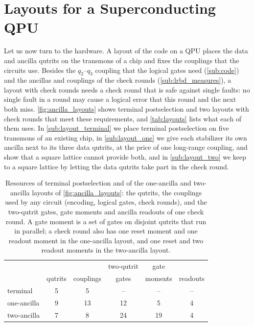 \section{Layouts for a Superconducting QPU}
\label{sub:ancilla_layouts}

Let us now turn to the hardware. A layout of the code on a QPU places the data and ancilla qutrits on the transmons of a chip and fixes the couplings that the circuits use. Besides the $q_2$--$q_3$ coupling that the logical gates need (\autoref{sub:code}) and the ancillas and couplings of the check rounds (\autoref{sub:lrbd_measures}), a layout with check rounds needs a check round that is safe against single faults: no single fault in a round may cause a logical error that this round and the next both miss. \autoref{fig:ancilla_layouts} shows terminal postselection and two layouts with check rounds that meet these requirements, and \autoref{tab:layouts} lists what each of them uses. In \autoref{sub:layout_terminal} we place terminal postselection on five transmons of an existing chip, in \autoref{sub:layout_one} we give each stabilizer its own ancilla next to its three data qutrits, at the price of one long-range coupling, and show that a square lattice cannot provide both, and in \autoref{sub:layout_two} we keep to a square lattice by letting the data qutrits take part in the check round.



\begin{table}[tp]%
  \centering
  \begin{tabular}{lccccc}
    \hline\hline
     & & & two-qutrit & gate & \\
     & qutrits & couplings & gates & moments & readouts \\
    \hline
    terminal & 5 & 5 & -- & -- & -- \\
    one-ancilla & 9 & 13 & 12 & 5 & 4 \\
    two-ancilla & 7 & 8 & 24 & 19 & 4 \\
    \hline\hline
  \end{tabular}
  \caption{Resources of terminal postselection and of the one-ancilla and two-ancilla layouts of \autoref{fig:ancilla_layouts}: the qutrits, the couplings used by any circuit (encoding, logical gates, check rounds), and the two-qutrit gates, gate moments and ancilla readouts of one check round. A gate moment is a set of gates on disjoint qutrits that run in parallel; a check round also has one reset moment and one readout moment in the one-ancilla layout, and one reset and two readout moments in the two-ancilla layout.}
  \label{tab:layouts}
\end{table}

